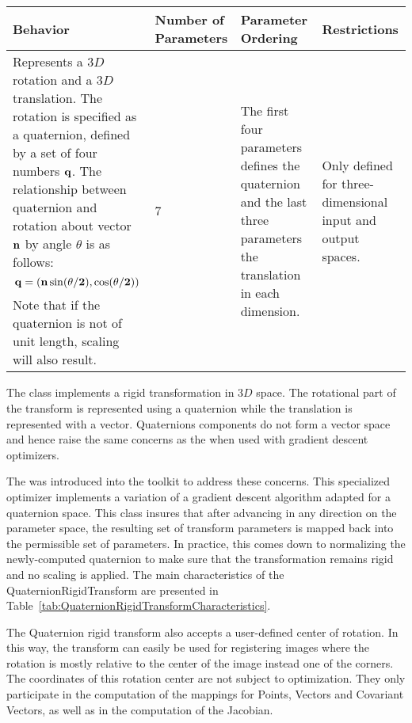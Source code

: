 \begin{table}
\begin{center}
\begin{tabular}{| p{4cm} | p{1.8cm} | p{2.5cm} | p{3cm} |}
\hline
\textbf{Behavior} &
\textbf{Number of Parameters} &
\textbf{Parameter Ordering} &
\textbf{Restrictions} \\
\hline\hline
Represents a $3D$ rotation and a $3D$ translation. The rotation is specified as a
quaternion, defined by a set of four numbers $\bf{q}$.  The relationship
between quaternion and rotation about vector $\bf{n}$ by angle $\theta$ is as
follows: \[ \bf{q} = (\bf{n}\sin(\theta/2), \cos(\theta/2))\] Note that if the
quaternion is not of unit length, scaling will also result. &
7 &
The first four parameters defines the quaternion and the last three parameters
the translation in each dimension. &
Only defined for three-dimensional input and output spaces. \\
\hline
\end{tabular}
\end{center}
\end{table}

The  class implements a rigid
transformation in $3D$ space. The rotational part of the transform is
represented using a quaternion while the translation is represented with a
vector. Quaternions components do not form a vector space and hence raise the
same concerns as the  when used with gradient
descent optimizers.

The  was introduced into the toolkit to address these concerns.  This specialized optimizer implements a variation of a
gradient descent algorithm adapted for a quaternion space.  This class
insures that after advancing in any direction on the parameter space, the
resulting set of transform parameters is mapped back into the permissible
set of parameters. In practice, this comes down to normalizing the newly-computed quaternion to make sure that the transformation remains rigid and no
scaling is applied.  The main characteristics of the
QuaternionRigidTransform are presented in
Table~\ref{tab:QuaternionRigidTransformCharacteristics}.

The Quaternion rigid transform also accepts a user-defined center of rotation.
In this way, the transform can easily be used for registering images where the
rotation is mostly relative to the center of the image instead one of the
corners. The coordinates of this rotation center are not subject to
optimization. They only participate in the computation of the mappings for
Points, Vectors and Covariant Vectors, as well as in the computation of the
Jacobian.



